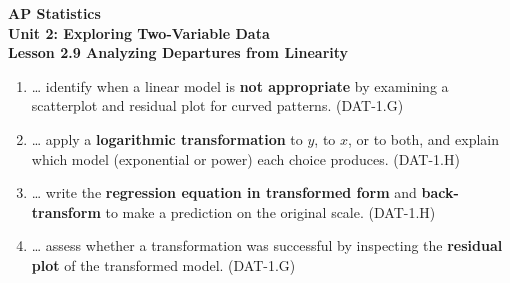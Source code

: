 \documentclass[10pt]{article}
\begin{document}
\vspace{-0.8in}

\begin{center}
  {\color{white}\textbf{\LARGE AP Statistics}}\\[4pt]
  {\color{skymid}\large\textbf{Unit 2: Exploring Two-Variable Data}}\\[6pt]
  {\color{white}\textbf{\large Lesson 2.9 \quad Analyzing Departures from Linearity}}
\end{center}

\vspace{0.22in}
\namedateperiod
\vspace{0.18in}

\begin{learningtargetbox}
\small
\begin{enumerate}[leftmargin=1.5em, itemsep=5pt]
  \item \ldots{} identify when a linear model is \textbf{not appropriate} by examining a
        scatterplot and residual plot for curved patterns.
        \hfill\textcolor{slate}{\small(DAT-1.G)}
  \item \ldots{} apply a \textbf{logarithmic transformation} to $y$, to $x$, or to both,
        and explain which model (exponential or power) each choice produces.
        \hfill\textcolor{slate}{\small(DAT-1.H)}
  \item \ldots{} write the \textbf{regression equation in transformed form} and
        \textbf{back-transform} to make a prediction on the original scale.
        \hfill\textcolor{slate}{\small(DAT-1.H)}
  \item \ldots{} assess whether a transformation was successful by inspecting the
        \textbf{residual plot} of the transformed model.
        \hfill\textcolor{slate}{\small(DAT-1.G)}
\end{enumerate}
\end{learningtargetbox}

\vspace{0.14in}
\end{document}
